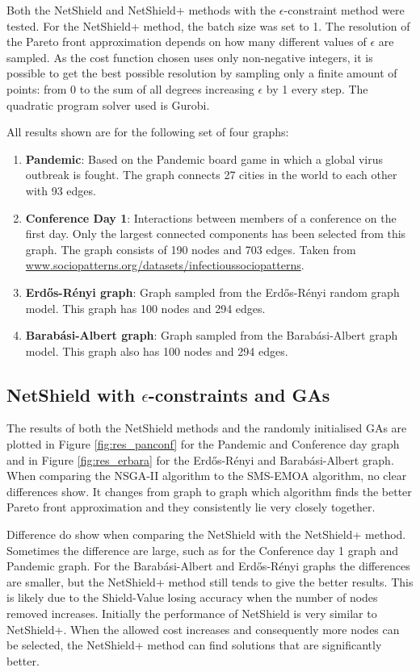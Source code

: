 \documentclass{svproc}
\begin{document}
Both the NetShield and NetShield+ methods with the $\epsilon$-constraint method were tested. For the NetShield+ method, the batch size was set to 1. The resolution of the Pareto front approximation depends on how many different values of $\epsilon$ are sampled. As the cost function chosen uses only non-negative integers, it is possible to get the best possible resolution by sampling only a finite amount of points: from 0 to the sum of all degrees increasing $\epsilon$ by 1 every step. The quadratic program solver used is Gurobi.

All results shown are for the following set of four graphs:

\begin{enumerate}
    \item  \textbf{Pandemic}: Based on the Pandemic board game in which a global virus outbreak is fought. The graph connects 27 cities in the world to each other with 93 edges.
     \item \textbf{Conference Day 1}: Interactions between members of a conference on the first day. Only the largest connected components has been selected from this graph. The graph consists of 190 nodes and 703 edges. Taken from \url{www.sociopatterns.org/datasets/infectioussociopatterns}.
     \item \textbf{Erd\H{o}s-R\'enyi graph}: Graph sampled from the Erd\H{o}s-R\'enyi random graph model. This graph has 100 nodes and 294 edges.
     \item \textbf{Barab\'asi-Albert graph}: Graph sampled from the Barab\'asi-Albert graph model. This graph also has 100 nodes and 294 edges.
\end{enumerate}

\subsection{NetShield with $\epsilon$-constraints and GAs}

The results of both the NetShield methods and the randomly initialised GAs are plotted in Figure \ref{fig:res_panconf} for the Pandemic and Conference day graph and in Figure \ref{fig:res_erbara} for the Erd\H{o}s-R\'enyi and Barab\'asi-Albert graph. When comparing the NSGA-II algorithm to the SMS-EMOA algorithm, no clear differences show. It changes from graph to graph which algorithm finds the better Pareto front approximation and they consistently lie very closely together.

Difference do show when comparing the NetShield with the NetShield+ method. Sometimes the difference are large, such as for the Conference day 1 graph and Pandemic graph. For the Barab\'asi-Albert and Erd\H{o}s-R\'enyi graphs the differences are smaller, but the NetShield+ method still tends to give the better results. This is likely due to the Shield-Value losing accuracy when the number of nodes removed increases. Initially the performance of NetShield is very similar to NetShield+. When the allowed cost increases and consequently more nodes can be selected, the NetShield+ method can find solutions that are significantly better. 
\end{document}

